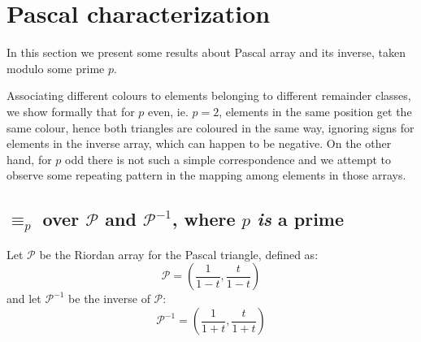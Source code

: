 
\section{Pascal characterization}

In this section we present some results about Pascal array and
its inverse, taken modulo some prime $p$. 

Associating different colours to elements belonging to different remainder
classes, we show formally that for $p$ even, ie. $p=2$, elements in the same
position get the same colour, hence both triangles are coloured in the same
way, ignoring signs for elements in the inverse array, which can happen to be
negative. On the other hand, for $p$ odd there is not such a simple
correspondence and we attempt to observe some repeating pattern in the mapping
among elements in those arrays.

\subsection{$\equiv_{p}$ over $\mathcal{P}$ and $\mathcal{P}^{-1}$,
    where $p$ \emph{is} a prime}

Let $\mathcal{P}$ be the Riordan array for the Pascal triangle,
defined as:
\begin{displaymath} 
    \mathcal{P} = \left(\frac{1}{1-t}, \frac{t}{1-t}  \right)
\end{displaymath} 
and let $\mathcal{P}^{-1}$ be the inverse of $\mathcal{P}$:
\begin{displaymath} 
    \mathcal{P}^{-1} = \left(\frac{1}{1+t}, \frac{t}{1+t}  \right)
\end{displaymath} 

